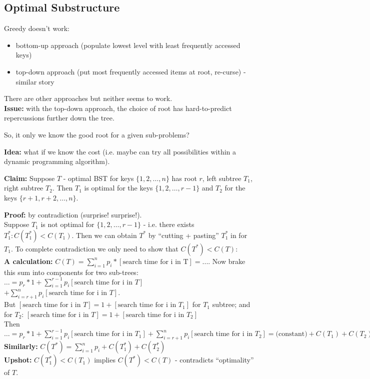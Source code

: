 \documentclass{scrartcl}
\begin{document}
\subsection{Optimal Substructure}
\label{sec:12-2}
Greedy doesn't work:
\begin{itemize}
\item bottom-up approach (populate lowest level with least frequently accessed
  keys)
\item top-down approach (put most frequently accessed items at root, re-curse) -
  similar story 
\end{itemize}
There are other approaches but neither seems to work.\\
{\bf Issue: } with the top-down approach, the choice of root has hard-to-predict
repercussions further down the tree.

So, it only we know the good root for a given sub-problems?

{\bf Idea: } what if we know the cost (i.e. maybe can try all possibilities
within a dynamic programming algorithm).

{\bf Claim: } Suppose $T$ - optimal BST for keys $\{1, 2, \dots, n\}$ has root
$r$, left subtree $T_1$, right subtree $T_2$. Then $T_1$ is optimal for the keys
$\{1, 2, \dots, r-1\}$ and $T_2$ for the keys $\{r+1, r+2, \dots, n\}$. 

{\bf Proof: } by contradiction (surprise! surprise!). \\
Suppose $T_1$ is not optimal for $\{1, 2, \dots, r-1\}$ - i.e. there exists
$T^*_1: C(T^*_1) < C(T_1)$. Then we can obtain $T^*$ by ``cutting + pasting''
$T^*_1$ in for $T_1$. To complete contradiction we only need to show that
$C(T^*) < C(T)$:\\
{\bf A calculation: } $C(T) = \sum \limits_{i=1}^n p_i*[\text{search time for i
  in T}]= ...$. Now brake this sum into components for two sub-trees: $\dots =
p_r * 1 + \sum \limits_{i=1}^{r-1} p_i [\text{search time for i in }T]$ $+\sum
\limits_{i=r + 1}^{n} p_i [\text{search time for i in }T]$.\\ 
But $[\text{search time for i in }T] = 1 + [\text{search time for i in }T_1]$
for $T_1$ subtree; and for $T_2$: $[\text{search time for i in }T] = 1 +
[\text{search time for i in }T_2]$\\
Then $\dots = p_r * 1 + \sum \limits_{i=1}^{r-1} p_i [\text{search time for i in }T_1]  +
\sum \limits_{i=r + 1}^{n} p_i [\text{search time for i in }T_2] =
\text{(constant)} + C(T_1) + C(T_2)$\\
{\bf Similarly: } $C(T^*) = \sum \limits_{i=1}^n p_i + C(T^*_1) + C(T^*_2)$\\
{\bf Upshot: } $C(T_1^*) < C(T_1)$ implies $C(T^*) < C(T)$ - contradicts
``optimality'' of $T$.
\end{document}
